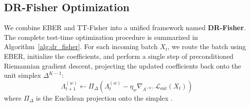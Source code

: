 \documentclass{article}
\theoremstyle{plain}
\theoremstyle{definition}
\theoremstyle{remark}
\begin{document}
\subsection{DR-Fisher Optimization}
We combine EBER and TT-Fisher into a unified framework named \textbf{DR-Fisher}. The complete test-time optimization procedure is summarized in Algorithm~\ref{alg:dr_fisher}. For each incoming batch $X_t$, we route the batch using EBER, initialize the coefficients, and perform a single step of preconditioned Riemannian gradient descent, projecting the updated coefficients back onto the unit simplex $\Delta^{K-1}$:
\begin{equation}
\Lambda^{(w)}_{t+1} \leftarrow \Pi_{\Delta} \left( \Lambda^{(w)}_t - \eta_w \nabla_{\Lambda^{(w)}} \mathcal{L}_{\text{ent}}(X_t) \right)
\end{equation}
where $\Pi_{\Delta}$ is the Euclidean projection onto the simplex \cite{duchi2008efficient}.
\end{document}
